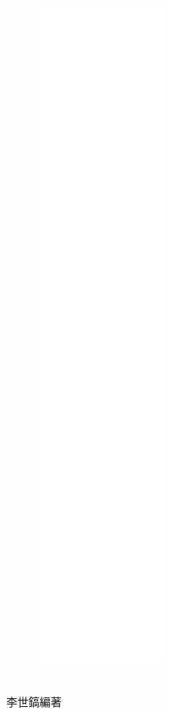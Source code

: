 \documentclass[a5paper,12pt]{memoir}
\begin{document}
\linespread{1.25}
\begin{figure}
\includegraphics[height=220mm]{cover.png}
\end{figure}
\hfill
\vfill
{}\\
{李世鎬\hspace{14pt}編著}
\vspace{64pt}
\newpage
\topmargin 5mm
\frontmatter
\linespread{1.25}

\mainmatter
\linespread{1.25}
\begin{multicols}{3}

\end{multicols}
\newpage

\end{document}
